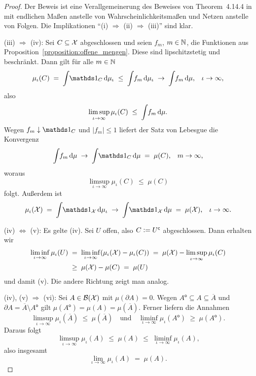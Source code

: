 \documentclass[../thesis/thesis.tex]{subfiles}
\begin{document}
	\begin{proof}
		Der Beweis ist eine Verallgemeinerung des Beweises von Theorem~4.14.4 in \cite{Simon.2015} mit endlichen Maßen 
		anstelle von Wahrscheinlichkeitsmaßen und Netzen anstelle von Folgen. Die Implikationen \enquote{(i) $\Rightarrow$ (ii) $\Rightarrow$ (iii)} sind klar. 
		
		(iii) $\Rightarrow$ (iv): Sei $C \subseteq \mathcal{X}$ abgeschlossen und seien 
		$f_m$, $m \in \mathbb{N}$, die Funktionen aus Proposition~\ref{proposition:offene_mengen}. 
		Diese sind lipschitzstetig und beschränkt.
		Dann gilt für alle $m \in \mathbb{N}$
		$$\mu_\iota(C) \; = \; \measureint{}{\indfct_C}{\mu_\iota} \; \leq \; 
		\measureint{}{f_m}{\mu_\iota} \; \to \;
		\measureint{}{f_m}{\mu} \text{,} \quad \iota \to \infty \text{,}$$
		also 
		$$\limsup_{\iota \to \infty} \mu_\iota(C) \; \leq \; 
		\int_{} \, f_m \, \mathrm{d}\mu \text{.}$$
		Wegen $f_m \convdown \indfct_C$ und $| f_m | \leq 1$ 
		liefert der Satz von Lebesgue die Konvergenz
		$$\measureint{}{f_m}{\mu} \; \to \;
		\measureint{}{\indfct_C}{\mu} \; = \; \mu(C) \text{,} 
		\quad m \to \infty \text{,}$$
		woraus
		$$\limsup_{\iota \to \infty} \mu_\iota(C) \; \leq \; \mu(C)$$
		folgt. Außerdem ist 
		$$\mu_\iota(\X) \; = \; \measureint{}{\indfct_{\X}}{\mu_\iota} \; \to \; \measureint{}{\indfct_{\X}}{\mu} \; = \; \mu(\X) \text{,} 
		\quad \iota \to \infty \text{.}$$
		
		(iv) $\Leftrightarrow$ (v): Es gelte (iv). Sei $U$ offen, also 
		$C \vcentcolon = U^\mathsf{c}$ abgeschlossen. Dann erhalten wir
		\begin{align*}
			\liminf_{\iota \to \infty} \mu_\iota(U) \; &= \; \liminf_{\iota \to \infty} (\mu_\iota(\mathcal{X}) - \mu_\iota(C)) \; = \;
			\mu(\mathcal{X}) - \limsup_{\iota \to \infty} \mu_\iota(C) \\
			&\geq \; 
			\mu(\mathcal{X}) - \mu(C) \; = \; \mu(U)
		\end{align*}
		und damit (v). Die andere Richtung zeigt man analog.
		
		(iv), (v) $\Rightarrow$ (vi): Sei $A \in \mathcal{B}(\mathcal{X})$ mit 
		$\mu(\partial A) = 0$. Wegen
		$A^\mathsf{o} \subseteq A \subseteq \overline{A}$ und 
		$\partial A = \overline{A} \setminus A^\mathsf{o}$ gilt $\mu(A^\mathsf{o}) = 
		\mu(A) = \mu(\overline{A}) \text{.}$
		Ferner liefern die Annahmen
		$$\limsup_{\iota \to \infty} \mu_\iota(\overline{A}) \; \leq \; 
		\mu(\overline{A}) \quad \text{und} \quad 
		\liminf_{\iota \to \infty} \mu_\iota(A^\mathsf{o}) \; \geq \; 
		\mu(A^\mathsf{o}) \text{.}$$
		Daraus folgt
		$$\limsup_{\iota \to \infty} \mu_\iota(A) \; \leq \; 
		\mu(A) \; \leq \; \liminf_{\iota \to \infty} \mu_\iota(A) \text{,}$$
		also insgesamt
		$$\lim_{\iota \to \infty} \mu_\iota(A) \; = \; \mu(A) \text{.}$$
		

\end{proof}
\end{document}
